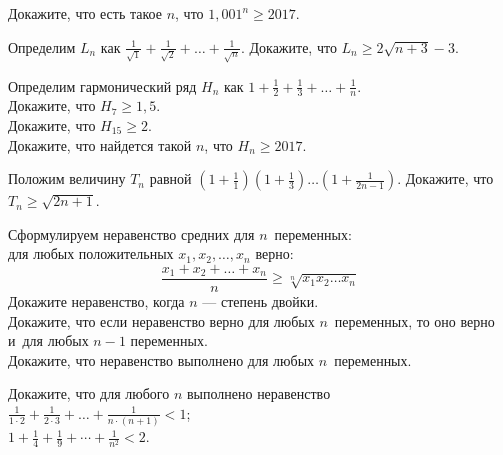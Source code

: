 


\begin{problems}

\item
Докажите, что есть такое $n$, что $1{,}001^{n} \geq 2017$.

\item
Определим $L_{n}$ как 
\(
    \frac{1}{\sqrt{1}} + \frac{1}{\sqrt{2}} + \ldots + \frac{1}{\sqrt{n}}
\).
Докажите, что $L_{n} \geq 2 \sqrt{n + 3} - 3$. 

\item
Определим гармонический ряд $H_{n}$ как 
\(
    1 + \frac{1}{2} + \frac{1}{3} + \ldots + \frac{1}{n}
\).
\\
\subproblem
Докажите, что $H_{7} \geq 1{,}5$.
\\
\subproblem
Докажите, что $H_{15} \geq 2$.
\\
\subproblem
Докажите, что найдется такой $n$, что $H_{n} \geq 2017$.

\item
Положим величину $T_{n}$ равной
\(
    \left( 1 + \frac{1}{1} \right)
    \left( 1 + \frac{1}{3} \right)
    \ldots
    \left( 1 + \frac{1}{2n - 1} \right)
\).
Докажите, что $T_{n} \geq \sqrt{2 n + 1}$.

\item
Сформулируем неравенство средних для $n$~переменных:\\
для любых положительных $x_1, x_2, \ldots, x_n$ верно:
\[
    \frac{x_{1} + x_{2} + \ldots + x_{n}}{n}
\geq
    \sqrt[n]{x_{1} x_{2} \ldots x_{n}}
\]
\subproblem
Докажите неравенство, когда $n$ --- степень двойки.
\\
\subproblem
Докажите, что если неравенство верно для любых $n$~переменных, то оно верно
и~для любых $n - 1$ переменных.
\\
\subproblem
Докажите, что неравенство выполнено для любых $n$~переменных.

\item
Докажите, что для любого $n$ выполнено неравенство
\\[0.5ex]
\subproblem
\( \displaystyle
    \frac{1}{1 \cdot 2} + \frac{1}{2 \cdot 3} + \ldots
    + \frac{1}{n \cdot (n + 1)}
<
    1
\);
\\[1.0ex]
\subproblem
\( \displaystyle
    1 + \frac{1}{4} + \frac{1}{9} + \cdots + \frac{1}{n^2}
<
    2
\).

\end{problems}

